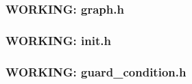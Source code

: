 \subsubsection{WORKING: graph.h}
\subsubsection{WORKING: init.h}
\subsubsection{WORKING: guard\_condition.h}